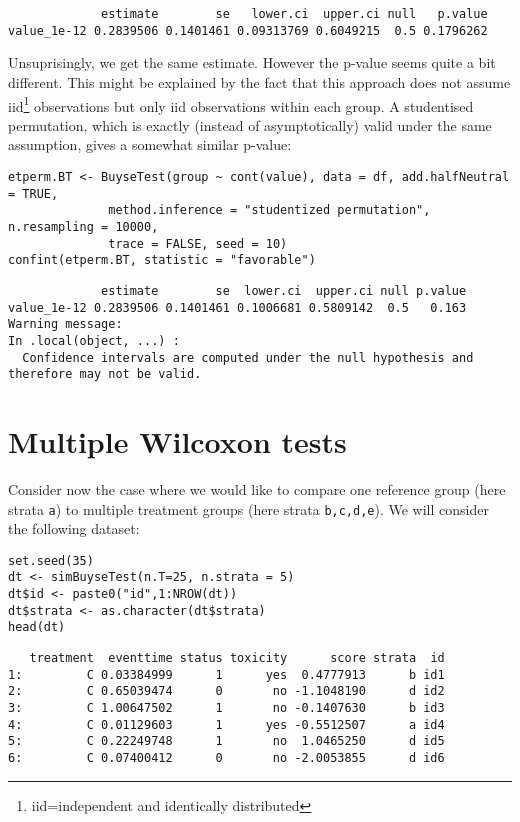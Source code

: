 \documentclass[12pt]{article}
\begin{document}
\begin{verbatim}
             estimate        se   lower.ci  upper.ci null   p.value
value_1e-12 0.2839506 0.1401461 0.09313769 0.6049215  0.5 0.1796262
\end{verbatim}


Unsuprisingly, we get the same estimate. However the p-value seems
quite a bit different. This might be explained by the fact that this
approach does not assume iid\footnote{iid=independent and identically
distributed} observations but only iid observations within each
group. A studentised permutation, which is exactly (instead of
asymptotically) valid under the same assumption, gives a somewhat
similar p-value:
\lstset{language=r,label= ,caption= ,captionpos=b,numbers=none}
\begin{lstlisting}
etperm.BT <- BuyseTest(group ~ cont(value), data = df, add.halfNeutral = TRUE,
		      method.inference = "studentized permutation", n.resampling = 10000,
		      trace = FALSE, seed = 10)
confint(etperm.BT, statistic = "favorable")
\end{lstlisting}

\begin{verbatim}
             estimate        se  lower.ci  upper.ci null p.value
value_1e-12 0.2839506 0.1401461 0.1006681 0.5809142  0.5   0.163
Warning message:
In .local(object, ...) :
  Confidence intervals are computed under the null hypothesis and therefore may not be valid.
\end{verbatim}

\section{Multiple Wilcoxon tests}
\label{sec:org7ded83e}

Consider now the case where we would like to compare one reference
group (here strata \texttt{a}) to multiple treatment groups (here strata
\texttt{b,c,d,e}). We will consider the following dataset:
\lstset{language=r,label= ,caption= ,captionpos=b,numbers=none}
\begin{lstlisting}
set.seed(35)
dt <- simBuyseTest(n.T=25, n.strata = 5)
dt$id <- paste0("id",1:NROW(dt))
dt$strata <- as.character(dt$strata) 
head(dt)
\end{lstlisting}

\begin{verbatim}
   treatment  eventtime status toxicity      score strata  id
1:         C 0.03384999      1      yes  0.4777913      b id1
2:         C 0.65039474      0       no -1.1048190      d id2
3:         C 1.00647502      1       no -0.1407630      b id3
4:         C 0.01129603      1      yes -0.5512507      a id4
5:         C 0.22249748      1       no  1.0465250      d id5
6:         C 0.07400412      0       no -2.0053855      d id6
\end{verbatim}
\end{document}
